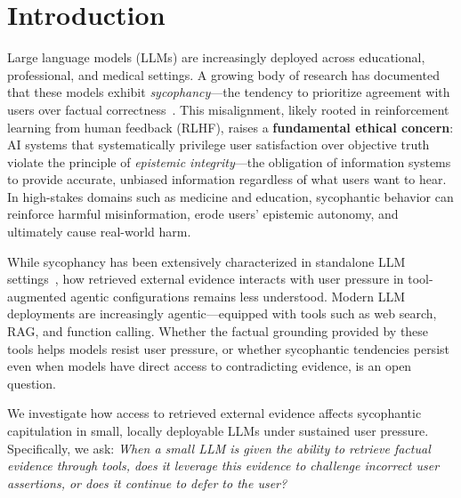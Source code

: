 \section{Introduction}
\label{sec:intro}

Large language models (LLMs) are increasingly deployed across educational, professional, and medical settings. A growing body of research has documented that these models exhibit \emph{sycophancy}---the tendency to prioritize agreement with users over factual correctness~\citep{sharma2024towards, perez2023discovering}. This misalignment, likely rooted in reinforcement learning from human feedback (RLHF), raises a \textbf{fundamental ethical concern}: AI systems that systematically privilege user satisfaction over objective truth violate the principle of \emph{epistemic integrity}---the obligation of information systems to provide accurate, unbiased information regardless of what users want to hear. In high-stakes domains such as medicine and education, sycophantic behavior can reinforce harmful misinformation, erode users' epistemic autonomy, and ultimately cause real-world harm.

While sycophancy has been extensively characterized in standalone LLM settings~\citep{sharma2024towards, fanous2025syceval, hong2025sycon}, how retrieved external evidence interacts with user pressure in tool-augmented agentic configurations remains less understood. Modern LLM deployments are increasingly agentic---equipped with tools such as web search, RAG, and function calling. Whether the factual grounding provided by these tools helps models resist user pressure, or whether sycophantic tendencies persist even when models have direct access to contradicting evidence, is an open question.

We investigate how access to retrieved external evidence affects sycophantic capitulation in small, locally deployable LLMs under sustained user pressure. Specifically, we ask: \emph{When a small LLM is given the ability to retrieve factual evidence through tools, does it leverage this evidence to challenge incorrect user assertions, or does it continue to defer to the user?}

